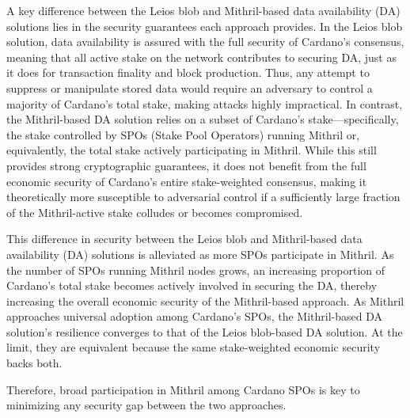\documentclass[../midgard.tex]{subfiles}
\begin{document}
A key difference between the Leios blob and Mithril-based data availability (DA) solutions lies in the security guarantees each approach provides.
In the Leios blob solution, data availability is assured with the full security of Cardano's consensus, meaning that all active stake on the network contributes to securing DA, just as it does for transaction finality and block production.
Thus, any attempt to suppress or manipulate stored data would require an adversary to control a majority of Cardano's total stake, making attacks highly impractical.
In contrast, the Mithril-based DA solution relies on a subset of Cardano's stake—specifically, the stake controlled by SPOs (Stake Pool Operators) running Mithril or, equivalently, the total stake actively participating in Mithril.
While this still provides strong cryptographic guarantees, it does not benefit from the full economic security of Cardano's entire stake-weighted consensus, making it theoretically more susceptible to adversarial control if a sufficiently large fraction of the Mithril-active stake colludes or becomes compromised.

This difference in security between the Leios blob and Mithril-based data availability (DA) solutions is alleviated as more SPOs participate in Mithril.
As the number of SPOs running Mithril nodes grows, an increasing proportion of Cardano's total stake becomes actively involved in securing the DA, thereby increasing the overall economic security of the Mithril-based approach.
As Mithril approaches universal adoption among Cardano's SPOs, the Mithril-based DA solution's resilience converges to that of the Leios blob-based DA solution.
At the limit, they are equivalent because the same stake-weighted economic security backs both.

Therefore, broad participation in Mithril among Cardano SPOs is key to minimizing any security gap between the two approaches.
\end{document}
